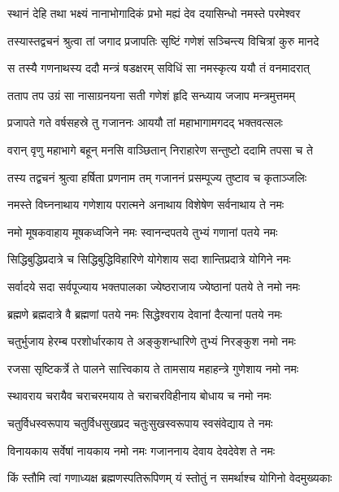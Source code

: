 \twolineshloka
{स्थानं देहि तथा भक्ष्यं नानाभोगादिकं प्रभो}
{मह्यं देव दयासिन्धो नमस्ते परमेश्वर} %

\twolineshloka
{तस्यास्तद्वचनं श्रुत्वा तां जगाद प्रजापतिः}
{सृष्टिं गणेशं सञ्चिन्त्य विचित्रां कुरु मानदे} %

\twolineshloka
{स तस्यै गणनाथस्य ददौ मन्त्रं षडक्षरम्}
{सविधिं सा नमस्कृत्य ययौ तं वनमादरात्} %

\twolineshloka
{तताप तप उग्रं सा नासाग्रनयना सती}
{गणेशं हृदि सन्ध्याय जजाप मन्त्रमुत्तमम्} %

\twolineshloka
{प्रजापते गते वर्षसहस्रे तु गजाननः}
{आययौ तां महाभागामगदद् भक्तवत्सलः} %


\twolineshloka
{वरान् वृणु महाभागे बहून् मनसि वाञ्छितान्}
{निराहारेण सन्तुष्टो ददामि तपसा च ते} %

\twolineshloka
{तस्य तद्वचनं श्रुत्वा हर्षिता प्रणनाम तम्}
{गजाननं प्रसम्पूज्य तुष्टाव च कृताञ्जलिः} %


\twolineshloka
{नमस्ते विघ्ननाथाय गणेशाय परात्मने}
{अनाथाय विशेषेण सर्वनाथाय ते नमः} %

\twolineshloka
{नमो मूषकवाहाय मूषकध्वजिने नमः}
{स्वानन्दपतये तुभ्यं गणानां पतये नमः} %

\twolineshloka
{सिद्धिबुद्धिप्रदात्रे च सिद्धिबुद्धिविहारिणे}
{योगेशाय सदा शान्तिप्रदात्रे योगिने नमः} %

\twolineshloka
{सर्वादये सदा सर्वपूज्याय भक्तपालका}
{ज्येष्ठराजाय ज्येष्ठानां पतये ते नमो नमः} %

\twolineshloka
{ब्रह्मणे ब्रह्मदात्रे वै ब्रह्मणां पतये नमः}
{सिद्धेश्वराय देवानां दैत्यानां पतये नमः} %

\twolineshloka
{चतुर्भुजाय हेरम्ब परशोर्धारकाय ते}
{अङ्कुशन्धारिणे तुभ्यं निरङ्कुश नमो नमः} %

\twolineshloka
{रजसा सृष्टिकर्त्रे ते पालने सात्त्विकाय ते}
{तामसाय महाहन्त्रे गुणेशाय नमो नमः} %

\twolineshloka
{स्थावराय चरायैव चराचरमयाय ते}
{चराचरविहीनाय बोधाय च नमो नमः} %

\twolineshloka
{चतुर्विधस्वरूपाय चतुर्विधसुखप्रद}
{चतुःसुखस्वरूपाय स्वसंवेद्याय ते नमः} %

\twolineshloka
{विनायकाय सर्वेषां नायकाय नमो नमः}
{गजाननाय देवाय देवदेवेश ते नमः} %

\twolineshloka
{किं स्तौमि त्वां गणाध्यक्ष ब्रह्मणस्पतिरूपिणम्}
{यं स्तोतुं न समर्थाश्च योगिनो वेदमुख्यकाः} %

